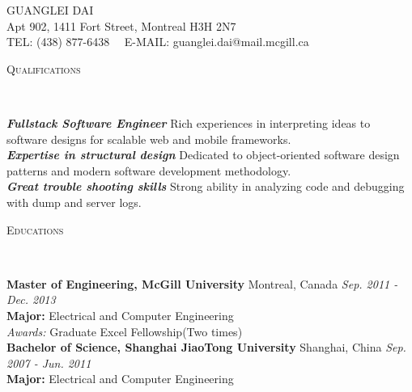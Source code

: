 \documentclass[11pt]{article}
\newenvironment{changemargin}[2]{%
  \begin{list}{}{%
    \setlength{\topsep}{0pt}%
    \setlength{\leftmargin}{#1}%
    \setlength{\rightmargin}{#2}%
    \setlength{\listparindent}{\parindent}%
    \setlength{\itemindent}{\parindent}%
    \setlength{\parsep}{\parskip}%
  }%
  \item[]}{\end{list}
}
\newcommand{\lineover}{
	\begin{changemargin}{-0.05in}{-0.05in}
		\vspace*{-8pt}
		\hrulefill \\
		\vspace*{-2pt}
	\end{changemargin}
}
\newcommand{\header}[1]{
	\begin{changemargin}{-0.5in}{-0.5in}
		\scshape{#1}\\
  	\lineover
	\end{changemargin}
}
\newcommand{\contact}[4]{
	\begin{changemargin}{-0.5in}{-0.5in}
		\begin{center}
			{\Large \scshape {#1}}\\ \smallskip
			{#2}\\ \smallskip
			{#3}\\ \smallskip
			{#4}\smallskip
		\end{center}
	\end{changemargin}
}
\newenvironment{body} {
	\vspace*{-16pt}
	\begin{changemargin}{-0.25in}{-0.5in}
  }	
	{\end{changemargin}
}
\begin{document}
\small
\contact{GUANGLEI DAI}{Apt 902, 1411 Fort Street,
Montreal H3H 2N7}{TEL: (438) 877-6438~~ E-MAIL: guanglei.dai@mail.mcgill.ca}
\smallskip
\header{Qualifications}
\begin{body}
	\vspace{14pt}
	\emph{\textbf{Fullstack Software Engineer}}{} {Rich experiences in interpreting ideas to software designs for scalable web and mobile frameworks.} \\
	\medskip
	\emph{\textbf{Expertise in structural design}}{} {Dedicated to object-oriented software design patterns and modern software development methodology.} \\
	\medskip
	\emph{\textbf{Great trouble shooting skills}}{} {Strong ability in analyzing code and debugging with dump and server logs.} \\
\end{body}
\smallskip

\header{Educations}
\begin{body}
	\vspace{14pt}
	\textbf{Master of Engineering, McGill University} {Montreal, Canada}   \hfill \emph{Sep. 2011 - Dec. 2013}{}  \\
	\textbf{Major:} Electrical and Computer Engineering \\
	\emph{Awards:} Graduate Excel Fellowship(Two times)\\

  \medskip	  
	\textbf{Bachelor of Science, Shanghai JiaoTong University} {Shanghai, China}   \hfill \emph{Sep. 2007 - Jun. 2011} \\
	\textbf{Major:} Electrical and Computer Engineering ~~~~~ \\
\end{body}
\smallskip
\end{document}
